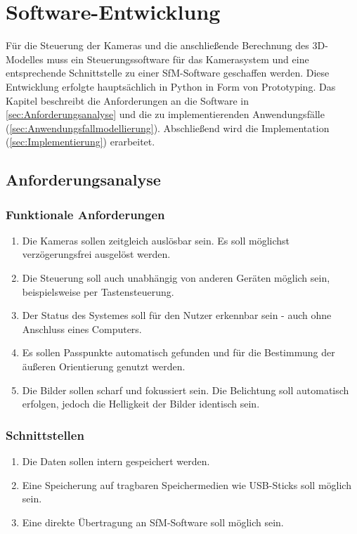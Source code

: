 \documentclass[./00PhotoBox.tex]{subfiles}
\begin{document}
\chapter{Software-Entwicklung}
Für die Steuerung der Kameras und die anschließende Berechnung des 3D-Modelles muss ein Steuerungssoftware für das Kamerasystem und eine entsprechende Schnittstelle zu einer \gls{SfM}-Software geschaffen werden. Diese Entwicklung erfolgte hauptsächlich in Python in Form von Prototyping. Das Kapitel beschreibt die Anforderungen an die Software in \autoref{sec:Anforderungsanalyse} und die zu implementierenden Anwendungsfälle (\autoref{sec:Anwendungsfallmodellierung}). Abschließend wird die Implementation (\autoref{sec:Implementierung}) erarbeitet.

\section{Anforderungsanalyse}
\label{sec:Anforderungsanalyse}

\subsection{Funktionale Anforderungen}
\begin{enumerate}[label=F\arabic*]
    \item Die Kameras sollen zeitgleich auslösbar sein. Es soll möglichst ver\-zögerungs\-frei ausgelöst werden.
    \item Die Steuerung soll auch unabhängig von anderen Geräten möglich sein, beispielsweise per Tastensteuerung.
    \item Der Status des Systemes soll für den Nutzer erkennbar sein - auch ohne Anschluss eines Computers.
    \item Es sollen Passpunkte automatisch gefunden und für die Bestimmung der äußeren Orientierung genutzt werden.
    \item Die Bilder sollen scharf und fokussiert sein. Die Belichtung soll automatisch erfolgen, jedoch die Helligkeit der Bilder identisch sein.
\end{enumerate}

\subsection{Schnittstellen}
\begin{enumerate}[label=S\arabic*]
    \item Die Daten sollen intern gespeichert werden.
    \item Eine Speicherung auf tragbaren Speichermedien wie USB-Sticks soll möglich sein.
    \item Eine direkte Übertragung an \gls{SfM}-Software soll möglich sein.
\end{enumerate}
\end{document}
